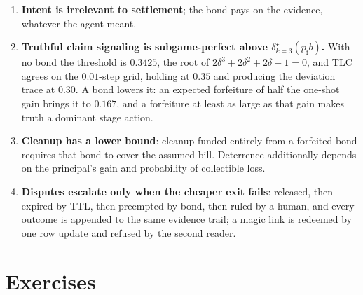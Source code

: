 \documentclass[11pt,a4paper]{article}
\theoremstyle{definition}
\theoremstyle{remark}
\begin{document}
\begin{enumerate}[leftmargin=1.6em,itemsep=2pt]
\item \textbf{Intent is irrelevant to settlement}; the bond pays on the evidence, whatever the agent meant.
\item \textbf{Truthful claim signaling is subgame-perfect above $\delta^\star_{k=3}(p_{\mathrm f}b)$.} With no bond the threshold is $0.3425$, the root of $2\delta^{3}+2\delta^{2}+2\delta-1=0$, and TLC agrees on the $0.01$-step grid, holding at $0.35$ and producing the deviation trace at $0.30$. A bond lowers it: an expected forfeiture of half the one-shot gain brings it to $0.167$, and a forfeiture at least as large as that gain makes truth a dominant stage action.
\item \textbf{Cleanup has a lower bound}: cleanup funded entirely from a forfeited bond requires that bond to
cover the assumed bill. Deterrence additionally depends on the principal's
gain and probability of collectible loss.
\item \textbf{Disputes escalate only when the cheaper exit fails}: released, then expired by TTL, then preempted by bond, then ruled by a human, and every outcome is appended to the same evidence trail; a magic link is redeemed by one row update and refused by the second reader.
\end{enumerate}

\section{Exercises}
\label{sec:bonded-exercises}

\end{document}
